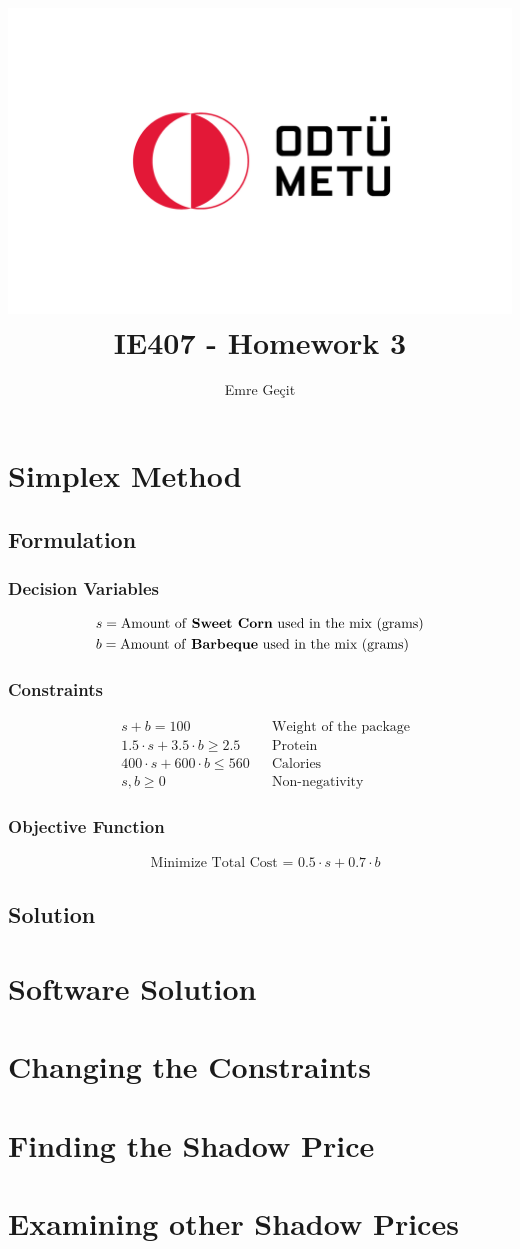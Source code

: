 \documentclass{article}
\author{Emre Geçit}
\title{\includegraphics{9.4.png}\\ IE407 - Homework 3}
\begin{document}
\maketitle

\newpage

\section{Simplex Method}

\subsection{Formulation}
\subsubsection*{Decision Variables}
\begin{align*}
    &s = \text{Amount of \textbf{Sweet Corn} used in the mix (grams)}\\
    &b = \text{Amount of \textbf{Barbeque} used in the mix (grams)}\\
\end{align*}

\subsubsection*{Constraints}
\begin{align*}
    &s + b = 100 && \text{Weight of the package}\\
    &1.5 \cdot s + 3.5 \cdot b \geq 2.5 && \text{Protein}\\
    &400 \cdot s + 600 \cdot b \leq 560 && \text{Calories}\\
    &s, b \geq 0 && \text{Non-negativity}
\end{align*}

\subsubsection*{Objective Function}
\begin{align*}
    &\text{Minimize Total Cost = } 0.5 \cdot s + 0.7 \cdot b
\end{align*}

\subsection{Solution}

\section{Software Solution}

\section{Changing the Constraints}

\section{Finding the Shadow Price}

\section{Examining other Shadow Prices}
\end{document}

